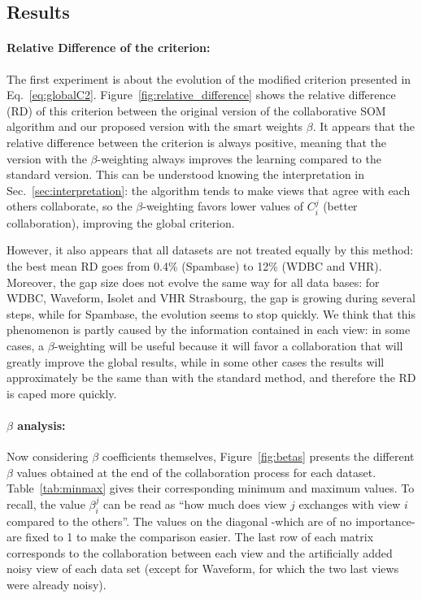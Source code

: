 \subsection{Results}


\paragraph{Relative Difference of the criterion:}
The first experiment is about the evolution of the modified criterion presented in Eq.~\ref{eq:globalC2}. Figure~\ref{fig:relative_difference} shows the relative difference (RD) of this criterion between the original version of the collaborative SOM algorithm and our proposed version with the smart weights $\beta$. It appears that the relative difference between the criterion is always positive, meaning that the version with the $\beta$-weighting always improves the learning compared to the standard version. This can be understood knowing the interpretation in Sec.~\ref{sec:interpretation}: the algorithm tends to make views that agree with each others collaborate, so the $\beta$-weighting favors lower values of $C^j_i$ (better collaboration), improving the global criterion.

However, it also appears that all datasets are not treated equally by this method: the best mean RD goes from 0.4\% (Spambase) to 12\% (WDBC and VHR). Moreover, the gap size does not evolve the same way for all data bases: for WDBC, Waveform, Isolet and VHR Strasbourg, the gap is growing during several steps, while for Spambase, the evolution seems to stop quickly. We think that this phenomenon is partly caused by the information contained in each view: in some cases, a $\beta$-weighting will be useful because it will favor a collaboration that will greatly improve the global results, while in some other cases the results will approximately be the same than with the standard method, and therefore the RD is caped more quickly.

\paragraph{$\beta$ analysis:}
Now considering $\beta$ coefficients themselves, Figure~\ref{fig:betas} presents the different $\beta$ values obtained at the end of the collaboration process for each dataset. Table~\ref{tab:minmax} gives their corresponding minimum and maximum values. To recall, the value $\beta^j_i$ can be read as ``how much does view $j$ exchanges with view $i$ compared to the others''. The values on the diagonal -which are of no importance- are fixed to 1 to make the comparison easier. The last row of each matrix corresponds to the collaboration between each view and the artificially added noisy view of each data set (except for Waveform, for which the two last views were already noisy). 


